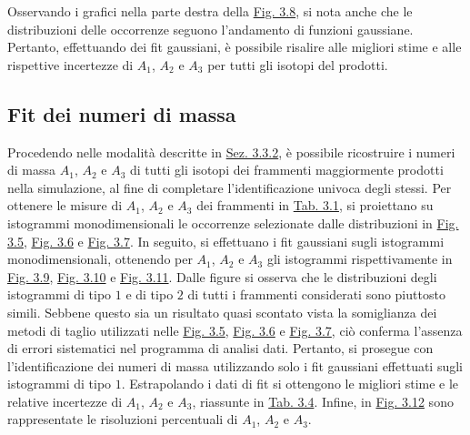 \documentclass[12pt,a4paper,twoside]{report}
\begin{document}
	Osservando i grafici nella parte destra della \hyperref[fig:berillium]{Fig. 3.8}, si nota anche che le distribuzioni delle occorrenze seguono l'andamento di funzioni gaussiane. Pertanto, effettuando dei fit gaussiani, è possibile risalire alle migliori stime e alle rispettive incertezze di $A_1$, $A_2$ e $A_3$ per tutti gli isotopi del  prodotti.
	
	\subsection{Fit dei numeri di massa}
	Procedendo nelle modalità descritte in \hyperref[sec:selection_number_of_mass]{Sez. 3.3.2}, è possibile ricostruire i numeri di massa $A_1$, $A_2$ e $A_3$ di tutti gli isotopi dei frammenti maggiormente prodotti nella simulazione, al fine di completare l'identificazione univoca degli stessi. Per ottenere le misure di $A_1$, $A_2$ e $A_3$ dei frammenti in \hyperref[tab:fragments]{Tab. 3.1}, si proiettano su istogrammi monodimensionali le occorrenze selezionate dalle distribuzioni in \hyperref[fig:a1_cut]{Fig. 3.5}, \hyperref[fig:a2_cut]{Fig. 3.6} e \hyperref[fig:a3_cut]{Fig. 3.7}. In seguito, si effettuano i fit gaussiani sugli istogrammi monodimensionali, ottenendo per $A_1$, $A_2$ e $A_3$ gli istogrammi rispettivamente in \hyperref[fig:a1_fragments_final]{Fig. 3.9}, \hyperref[fig:a2_fragments_final]{Fig. 3.10} e \hyperref[fig:a3_fragments_final]{Fig. 3.11}. Dalle figure si osserva che le distribuzioni degli istogrammi di tipo $1$ e di tipo $2$ di tutti i frammenti considerati sono piuttosto simili. Sebbene questo sia un risultato quasi scontato vista la somiglianza dei metodi di taglio utilizzati nelle \hyperref[fig:a1_cut]{Fig. 3.5}, \hyperref[fig:a2_cut]{Fig. 3.6} e \hyperref[fig:a3_cut]{Fig. 3.7}, ciò conferma l'assenza di errori sistematici nel programma di analisi dati. Pertanto, si prosegue con l'identificazione dei numeri di massa utilizzando solo i fit gaussiani effettuati sugli istogrammi di tipo $1$. Estrapolando i dati di fit si ottengono le migliori stime e le relative incertezze di $A_1$, $A_2$ e $A_3$, riassunte in \hyperref[tab:mass_numbers]{Tab. 3.4}. Infine, in \hyperref[fig:number_mass_resolution]{Fig. 3.12} sono rappresentate le risoluzioni percentuali di $A_1$, $A_2$ e $A_3$.
\end{document}
